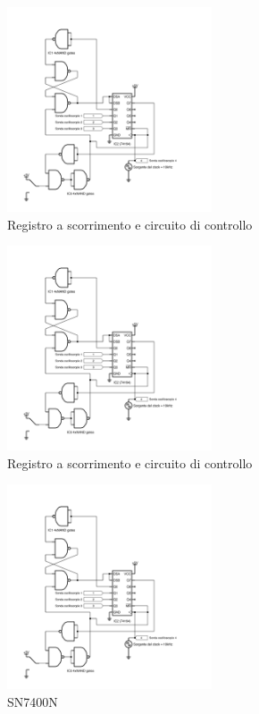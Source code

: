 \documentclass[journal]{IEEEtran}
\begin{document}
\begin{figure}[H]%
\begin{center}
\includegraphics[width=0.54\textwidth]{sch-simulations/output/shift-register.pdf}
\caption{Registro a scorrimento e circuito di controllo}
\label{fig:ledp}
\end{center}
\end{figure}

\begin{figure}[H]%
\begin{center}
\includegraphics[width=0.54\textwidth]{sch-simulations/output/shift-register.pdf}
\caption{Registro a scorrimento e circuito di controllo}
\label{fig:ledp}
\end{center}
\end{figure}

\begin{figure}[H]%
\begin{center}
\includegraphics[width=0.54\textwidth]{sch-simulations/output/shift-register.pdf}
\caption{SN7400N}
\label{fig:ledp}
\end{center}
\end{figure}
\end{document}

